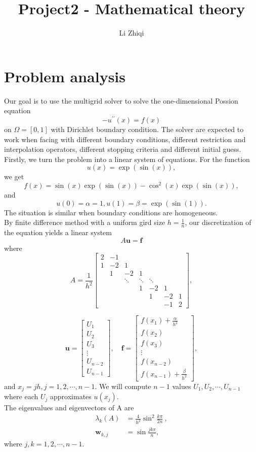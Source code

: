 \documentclass[a4paper,twocolumn]{article}
\title{Project2 - Mathematical theory}
\author{Li Zhiqi\quad3180103041}
\theoremstyle{definition}
\begin{document}
\maketitle
\section{Problem analysis}
Our goal is to use the multigrid solver to solve the one-dimensional Possion equation
$$
-u^{\prime \prime}(x)=f(x)
$$
on $\Omega = [0,1]$ with Dirichlet boundary condition. The solver are expected to work when facing with different boundary conditions, different restriction and interpolation operators, different stopping criteria and different initial guess. \\
Firstly, we turn the problem into a linear system of equations. For the function
$$
u(x) = \exp(\sin(x)),
$$
we get 
$$
f(x) = \sin(x)\exp(\sin(x))-\cos^2(x)\exp(\sin(x)),
$$
and
$$
u(0) = \alpha = 1,u(1) = \beta = \exp(\sin(1)) .
$$
The situation is similar when boundary conditions are homogeneous.\\
By finite difference method with a uniform gird size $h = \frac{1}{n}$, our discretization of the equation yields a linear system
$$
A\textbf{u} = \textbf{f}
$$
where
$$
A=\frac{1}{h^{2}}\left[\begin{array}{ccccccc}
2 & -1 & & & & & \\
1 & -2 & 1 & & & & \\
& 1 & -2 & 1 & & & \\
& & \ddots & \ddots & \ddots & & \\
& & & 1 & -2 & 1 & \\
& & & & 1 & -2 & 1 \\
& & & & & -1 & 2
\end{array}\right],
$$
\newpage

$$
\mathbf{u}=\left[\begin{array}{c}
U_{1} \\
U_{2} \\
U_{3} \\
\vdots \\
U_{n-2} \\
U_{n-1}
\end{array}\right], \quad \mathbf{f}=\left[\begin{array}{c}
f\left(x_{1}\right)+\frac{\alpha}{h^{2}} \\
f\left(x_{2}\right) \\
f\left(x_{3}\right) \\
\vdots \\
f\left(x_{n-2}\right) \\
f\left(x_{n-1}\right)+\frac{\beta}{h^{2}}
\end{array}\right],
$$
and $x_j = jh , j = 1,2,\cdots,n-1$. We will compute $n-1$ values $U_{1},U_{2},\cdots,U_{n-1}$ where each $U_{j}$ approximates $u(x_j)$.\\
The eigenvalues and eigenvectors of A are
$$
\begin{aligned}
\lambda_{k}(A)&=\frac{4}{h^{2}} \sin ^{2} \frac{k \pi}{2 n} \ , \\
\mathbf{w}_{k, j}&=\sin \frac{j k \pi}{n} ,
\end{aligned}
$$
where $j,k = 1,2,\cdots ,n-1$.
\end{document}
